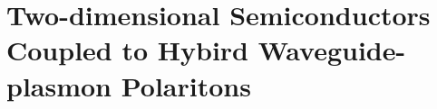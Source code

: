 
\chapter{Two-dimensional Semiconductors Coupled to Hybird Waveguide-plasmon Polaritons }
\label{sec:WPP}

